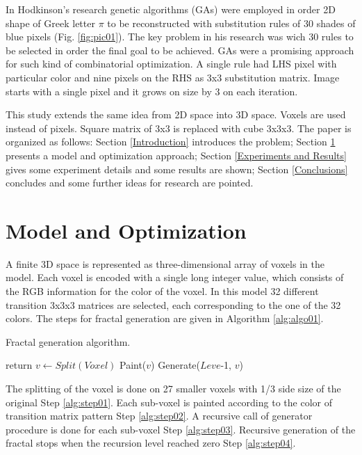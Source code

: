 \documentclass{llncs}
\begin{document}
In Hodkinson's research genetic algorithms (GAs) were employed in order 2D shape of Greek letter $\pi$ to be reconstructed with substitution rules of 30 shades of blue pixels (Fig. \ref{fig:pic01}). The key problem in his research was wich 30 rules to be selected in order the final goal to be achieved. GAs were a promising approach for such kind of combinatorial optimization. A single rule had LHS pixel with particular color and nine pixels on the RHS as 3x3 substitution matrix. Image starts with a single pixel and it grows on size by 3 on each iteration. 

This study extends the same idea from 2D space into 3D space. Voxels are used instead of pixels. Square matrix of 3x3 is replaced with cube 3x3x3. The paper is organized as follows: Section \ref{Introduction} introduces the problem; Section \ref{Model and Optimization} presents a model and optimization approach; Section \ref{Experiments and Results} gives some experiment details and some results are shown; Section \ref{Conclusions} concludes and some further ideas for research are pointed.

\section{Model and Optimization} \label{Model and Optimization}

A finite 3D space is represented as three-dimensional array of voxels in the model. Each voxel is encoded with a single long integer value, which consists of the RGB information for the color of the voxel. In this model 32 different transition 3x3x3 matrices are selected, each corresponding to the one of the 32 colors. The steps for fractal generation are given in Algorithm \ref{alg:algo01}.

\begin{algorithm}
\caption{Fractal generation algorithm.}\label{alg:algo01}
\begin{algorithmic}[1]
  \State return\label{alg:step04}
\EndIf
\State $v\gets Split(Voxel)$\label{alg:step01}
  \State Paint($v$)\label{alg:step02}
  \State Generate($Leve$-1, $v$)\label{alg:step03}
\EndFor
\EndProcedure
\end{algorithmic}
\end{algorithm}
\FloatBarrier

The splitting of the voxel is done on 27 smaller voxels with 1/3 side size of the original Step \ref{alg:step01}. Each sub-voxel is painted according to the color of transition matrix pattern Step \ref{alg:step02}. A recursive call of generator procedure is done for each sub-voxel Step \ref{alg:step03}. Recursive generation of the fractal stops when the recursion level reached zero Step \ref{alg:step04}.
\end{document}
